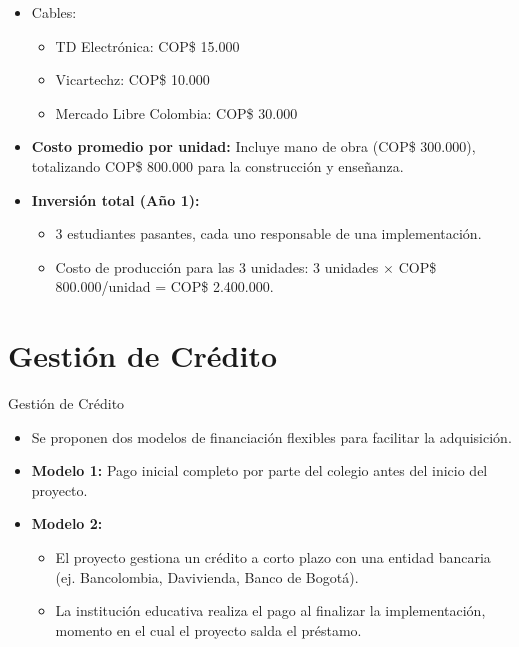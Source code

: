 \begin{frame}
  \begin{itemize}
    \item Cables:
      \begin{itemize}
        \item TD Electrónica: COP\$ 15.000
        \item Vicartechz: COP\$ 10.000
        \item Mercado Libre Colombia: COP\$ 30.000
      \end{itemize}
    \item \textbf{Costo promedio por unidad:} Incluye mano de obra
      (COP\$ 300.000), totalizando COP\$ 800.000 para la construcción y
      enseñanza.
    \item \textbf{Inversión total (Año 1):}
      \begin{itemize}
        \item 3 estudiantes pasantes, cada uno responsable de una
          implementación.
        \item Costo de producción para las 3 unidades: 3 unidades
          $\times$ COP\$ 800.000/unidad = COP\$ 2.400.000.
      \end{itemize}
  \end{itemize}
\end{frame}

\section{Gestión de Crédito}

\begin{frame}{Gestión de Crédito}
  \begin{itemize}
    \item Se proponen dos modelos de financiación flexibles para facilitar
      la adquisición.
    \item \textbf{Modelo 1:} Pago inicial completo por parte del colegio
      antes del inicio del proyecto.
    \item \textbf{Modelo 2:}
      \begin{itemize}
        \item El proyecto gestiona un crédito a corto plazo con una entidad
          bancaria (ej. Bancolombia, Davivienda, Banco de Bogotá).
        \item La institución educativa realiza el pago al finalizar la
          implementación, momento en el cual el proyecto salda el préstamo.
      \end{itemize}
  \end{itemize}
\end{frame}
